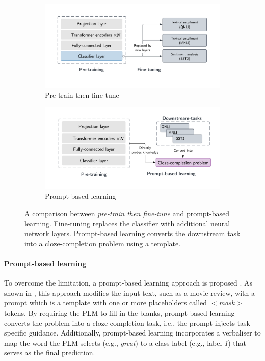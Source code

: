 \vspace{-0.3em}
\begin{figure}[!ht]
\begin{subfigure}{.5\textwidth}
  \centering
  \includegraphics[width=\linewidth]{figures/introduction_media/intro-compare-pf.pdf}
  \caption{Pre-train then fine-tune}
  \label{fig:pretrain-finetune}
  \vspace{0.2em}
\end{subfigure}%
\begin{subfigure}{.5\textwidth}
  \centering
  \includegraphics[width=\linewidth]{figures/introduction_media/intro-compare-pl.pdf}
  \caption{Prompt-based learning}
  \label{fig:prompt-learning}
  \vspace{0.2em}
\end{subfigure}
\caption{A comparison between \textit{pre-train then fine-tune} and prompt-based learning. Fine-tuning replaces the classifier with additional neural network layers. Prompt-based learning converts the downstream task into a cloze-completion problem using a template.}
\label{fig:intro-compare}
\end{figure}

\vspace{-1.5em}
\paragraph{Prompt-based learning} To overcome the limitation, a prompt-based learning approach is proposed \cite{Liu21}. As shown in , this approach modifies the input text, such as a movie review, with a prompt which is a template with one or more placeholders called $<$\textit{mask}$>$ tokens. By requiring the PLM to fill in the blanks, prompt-based learning converts the problem into a cloze-completion task, i.e., the prompt injects task-specific guidance. Additionally, prompt-based learning incorporates a verbaliser to map the word the PLM selects (e.g., \textit{great}) to a class label (e.g., label \textit{1}) that serves as the final prediction.

